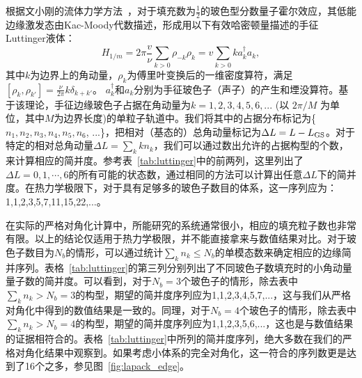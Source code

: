 

根据文小刚的流体力学方法~\cite{Wen1995}，对于填充数为$\frac{1}{2}$的玻色型分数量子霍尔效应，其低能边缘激发态由Kac-Moody代数描述，形成用以下有效哈密顿量描述的手征Luttinger液体：
\begin{equation}\label{eq:luttinger}
   H_{1/m}=2\pi \frac{v}{\nu}\displaystyle\sum_{k>0}\rho_{-k}\rho_k=v\sum_{k>0} k a^{\dagger}_k a_k,
\end{equation}
其中$k$为边界上的角动量，$\rho_k$为傅里叶变换后的一维密度算符，满足$[\rho_k,\rho_{k'}]=\frac{\nu}{2\pi}k\delta_{k+k'}$。 $a^{\dagger}_k$和$a_k$分别为手征玻色子（声子）的产生和堙没算符。基于该理论，手征边缘玻色子占据在角动量为$k=1, 2, 3, 4, 5, 6, ...$ (以 $2\pi/M$ 为单位，其中$M$为边界长度)的单粒子轨道中。我们将其中的占据分布标记为\{$n_1,n_2,n_3,n_4,n_5,n_6$, ...\}，把相对（基态的）总角动量标记为$\Delta L = L - L_{\rm GS}$。对于特定的相对总角动量$\Delta L = \sum_{k} kn_{k}$，我们可以通过数出允许的占据构型的个数，来计算相应的简并度。参考表~\ref{tab:luttinger}中的前两列，这里列出了$\Delta L = 0,1,\cdots,6$的所有可能的状态数，通过相同的方法可以计算出任意$\Delta L$下的简并度。在热力学极限下，对于具有足够多的玻色子数目的体系，这一序列应为：1,1,2,3,5,7,11,15,22,...。

在实际的严格对角化计算中，所能研究的系统通常很小，相应的填充粒子数也非常有限。以上的结论仅适用于热力学极限，并不能直接拿来与数值结果对比。对于玻色子数目为$N_b$的情形，可以通过统计$\sum_k n_k\le N_b$的单模态数来确定相应的边缘简并序列。表格~\ref{tab:luttinger}的第三列分别列出了不同玻色子数填充时的小角动量量子数的简并度。可以看到，对于$N_b=3$个玻色子的情形，除去表中$\sum_k n_k>N_b=3$的构型，期望的简并度序列应为1,1,2,3,4,5,7,...，这与我们从严格对角化中得到的数值结果是一致的。同理，对于$N_b=4$个玻色子的情形，除去表中$\sum_k n_k>N_b=4$的构型，期望的简并度序列应为1,1,2,3,5,6,...，这也是与数值结果的证据相符合的。表格~\ref{tab:luttinger}中所列的简并度序列，绝大多数在我们的严格对角化结果中观察到。如果考虑小体系的完全对角化，这一符合的序列数更是达到了16个之多，参见图~\ref{fig:lapack_edge}。

